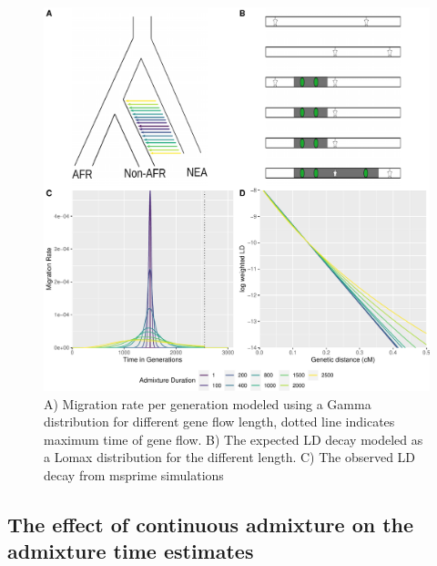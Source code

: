 \documentclass[]{article}
\begin{document}
\begin{figure}
\centering
\includegraphics{Admixture_Time_Inference_Paper_Draft_files/figure-latex/fig1-1.pdf}
\caption{\label{fig:fig1} A) Migration rate per generation modeled using
a Gamma distribution for different gene flow length, dotted line
indicates maximum time of gene flow. B) The expected LD decay modeled as
a Lomax distribution for the different length. C) The observed LD decay
from msprime simulations}
\end{figure}

\subsection{The effect of continuous admixture on the admixture time estimates}\label{the effect of continuous admixture on the admixture time estimates}
\end{document}
